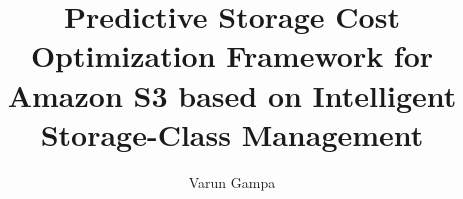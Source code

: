\documentclass{report}
\begin{document}
\title{Predictive Storage Cost Optimization Framework for Amazon S3 based on Intelligent Storage-Class Management}
\author{Varun Gampa}
\maketitle










\end{document}

